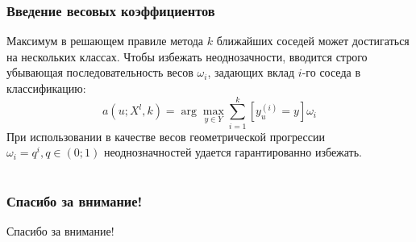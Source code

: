 \documentclass{beamer}
\begin{document}
\begin{frame}
\frametitle{Введение весовых коэффициентов}
Максимум в решающем правиле метода $k$ ближайших соседей может достигаться на нескольких классах. Чтобы избежать неоднозачности, вводится строго убывающая последовательность весов $\omega_i$, задающих вклад $i$-го соседа в классификацию:
$$a(u; X^l, k)=\arg\max\limits_{y \in Y}\sum\limits_{i=1}^{k}[y_u^{(i)}=y]\omega_i$$
При использовании в качестве весов геометрической прогрессии $\omega_i=q^i, q\in(0;1)$ неоднозначностей удается гарантированно избежать.
\end{frame} 

\section{}


\section{}
\begin{frame}
\frametitle{Спасибо за внимание!}
	Спасибо за внимание!
\end{frame}
\end{document}
